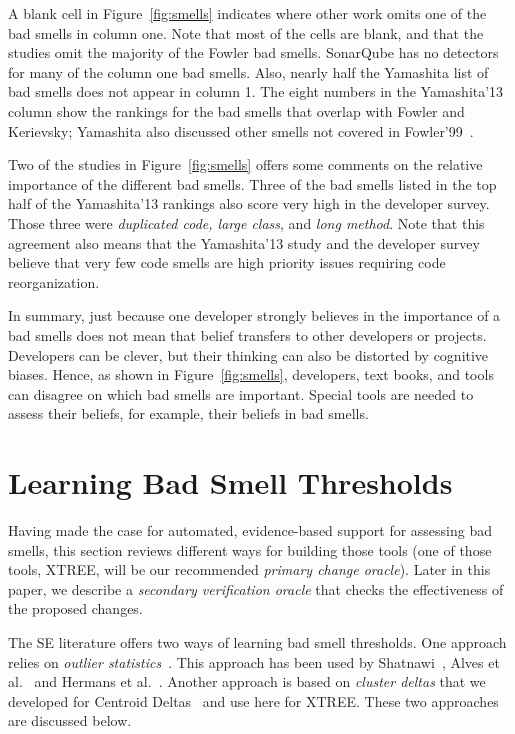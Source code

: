 \documentclass[twocolumn,5p]{elsarticle}
\newcommand{\fig}[1]{Figure~\ref{fig:#1}}
\theoremstyle{break}
\begin{document}
	
	
	
	
	A  blank cell in \fig{smells}
	indicates where   other work omits 
	one of the bad smells in column one. 
	Note that most of the cells are blank, and that the studies omit the majority of the Fowler bad smells.
	SonarQube has no detectors for many of the column one bad smells.
	Also, nearly half the Yamashita list of bad smells
	does not appear in column 1. The eight numbers
	in the  Yamashita'13 column show the rankings for the bad smells 
	that overlap with Fowler and Kerievsky; Yamashita also discussed other smells not covered in Fowler'99~\cite{fowler99}.
	
	
	Two of the studies in \fig{smells} offers some comments on the relative importance
	of the different bad smells. Three of the bad smells listed in the top half of the Yamashita'13 rankings also score very high in the developer survey. Those three were {\em duplicated code, large class}, 
	and {\em long method}. 
	Note that this agreement also means that the
	Yamashita'13 study and the developer survey   
	believe
	that very few  code smells are   high priority issues
	requiring code reorganization. 
	
	In summary, just because one developer strongly believes in the importance of a bad smells does not mean that belief transfers to other developers or projects.
	Developers can be clever, but their thinking can also be distorted
	by cognitive biases.
	Hence, as shown in \fig{smells}, developers, text books, and tools 
	can disagree on which bad smells are important.
	Special tools are needed to assess their beliefs, for example, their beliefs in
	bad smells.  
	
	
	\section{Learning Bad Smell Thresholds}\label{sect:bst}
	
	Having made the case for automated, evidence-based support for assessing bad smells,
	this section reviews different ways for building those tools (one of those tools,
	XTREE, will be our recommended {\em primary change oracle}).
	Later in this paper, we describe  a {\em secondary verification oracle}
	that checks the effectiveness of the proposed changes.
	
	The SE literature offers two ways of learning bad smell thresholds.
	One approach relies on 
	{\em outlier statistics}~\cite{erni96,bender99}. This approach
	has been used   by Shatnawi~\cite{Shatnawi10}, Alves et al.~\cite{Alves2010}
	and Hermans et al.~\cite{hermans15}.
	Another approach is 
	based on {\em cluster deltas} that we developed
	for   Centroid Deltas~\cite{me12c} and 
	use here for XTREE. 
	These two approaches are discussed below. 
	
\end{document}
